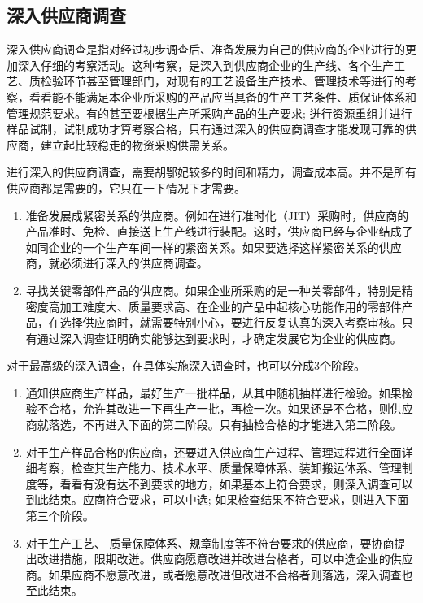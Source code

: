 \subsection {深入供应商调查}

    深入供应商调查是指对经过初步调查后、准备发展为自己的供应商的企业进行的更加深入仔细的考察活动。这种考察，是深入到供应商企业的生产线、各个生产工艺、质检验环节甚至管理部门，对现有的工艺设备生产技术、管理技术等进行的考察，看看能不能满足本企业所采购的产品应当具备的生产工艺条件、质保证体系和管理规范要求。有的甚至要根据生产所采购产品的生产要求; 迸行资源重组并进行样品试制，试制成功才算考察合格，只有通过深入的供应商调查才能发现可靠的供应商，建立起比较稳走的物资采购供需关系。

    进行深入的供应商调查，需要胡鄂妃较多的时间和精力，调查成本高。并不是所有供应商都是需要的，它只在一下情况下才需要。

    \begin{enumerate}
        \item 准备发展成紧密关系的供应商。例如在进行准时化（JIT）采购时，供应商的产品准时、免检、直接送上生产线进行装配。这时，供应商已经与企业结成了如同企业的一个生产车间一样的紧密关系。如果要选择这样紧密关系的供应商，就必须进行深入的供应商调查。
        \item 寻找关键零部件产品的供应商。如果企业所采购的是一种关零部件，特别是精密度高加工难度大、质量要求高、在企业的产品中起核心功能作用的零部件产品，在选择供应商时，就需要特别小心，要进行反复认真的深入考察审核。只有通过深入调查证明确实能够达到要求时，才确定发展它为企业的供应商。
    \end{enumerate}

    对于最高级的深入调查，在具体实施深入调查时，也可以分成3个阶段。

    \begin{enumerate}
        \item 通知供应商生产样品，最好生产一批样品，从其中随机抽样进行检验。如果检验不合格，允许其改进一下再生产一批，再检一次。如果还是不合格，则供应商就落选，不再进入下面的第二阶段。只有抽检合格的才能进入第二阶段。

        \item 对于生产样品合格的供应商，还要进入供应商生产过程、管理过程进行全面详细考察，检查其生产能力、技术水平、质量保障体系、装卸搬运体系、管理制度等，看看有没有达不到要求的地方，如果基本上符合要求，则深入调查可以到此结束。应商符合要求，可以中选; 如果检查结果不符合要求，则进入下面第三个阶段。

        \item 对于生产工艺、 质量保障体系、规章制度等不符台要求的供应商，要协商提出改进措施，限期改迸。供应商愿意改进并改进台格者，可以中选企业的供应商。如果应商不愿意改进，或者愿意改进但改进不合格者则落选，深入调查也至此结束。
    \end{enumerate}
